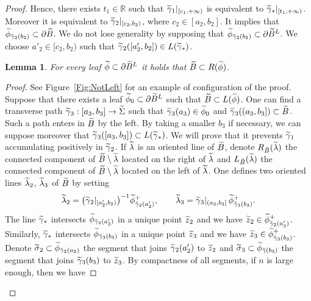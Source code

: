 \documentclass[10pt,a4paper]{article}
\newtheorem{lemm}[prop]{Lemma}
\theoremstyle{definition}
\theoremstyle{plain}
\numberwithin{equation}{section}
\numberwithin{figure}{section}
\newcommand{\R}{\mathbb{R}}
\let\oldtilde\tilde
\renewcommand*{\tilde}[1]{\mathchoice{\widetilde{#1}}{\widetilde{#1}}{\oldtilde{#1}}{\oldtilde{#1}}}
\begin{document}
\begin{proof}
Hence, there exists $t_1\in\R$ such that $\tilde\gamma_1|_{[c_1,+\infty)}$ is equivalent to $\tilde\gamma_*\vert_{[t_1,+\infty)}$. Moreover it is equivalent to $\tilde\gamma_2\vert_{[c_2,b_2)}$, where $c_2\in[a_2,b_2]$. It implies that $\tilde\phi_{\tilde\gamma_2(b_2)}\subset\partial\tilde B$. We do not lose generality by supposing that $\tilde\phi_{\tilde\gamma_2(b_2)}\subset\partial\tilde B^L$. We choose $a'_2\in[c_2,b_2)$ such that $\tilde\gamma_2([a'_2,b_2])\in L(\tilde\gamma_*)$.

\begin{lemm}\label{lem:NotLeft}
For every leaf $\tilde\phi\subset\partial\tilde B^L$ it holds that $\tilde B\subset R(\tilde \phi)$.
\end{lemm}

\begin{proof}
See Figure~\ref{Fig:NotLeft} for an example of configuration of the proof. Suppose that there exists a leaf $\tilde\phi_0\subset\partial\tilde B^L$ such that $\tilde B\subset L(\tilde \phi)$. One can find a transverse path $\tilde \gamma_3:[a_3,b_3]\to\tilde\Sigma$ such that $\tilde\gamma_3(a_3)\in\tilde\phi_0$ and $\tilde\gamma_3((a_3,b_3])\subset \tilde B$. Such a path enters in $\tilde B$ by the left. By taking a smaller $b_3$ if necessary, we can suppose moreover that $\tilde\gamma_3([a_3,b_3])\subset L(\tilde \gamma_*)$. We will prove that it prevents $\tilde\gamma_1$ accumulating positively in $\tilde\gamma_2$. If $\tilde \lambda$ is an oriented line of $\tilde B$, denote $R_{\tilde B}(\tilde\lambda)$ the connected component of $\tilde B\setminus\tilde\lambda$ located on the right of $\tilde\lambda$ and $L_{\tilde B}(\tilde\lambda)$ the connected component of $\tilde B\setminus\tilde\lambda$ located on the left of $\tilde\lambda$. One defines two oriented lines $\tilde\lambda_2$, $\tilde\lambda_3$ of $\tilde B$ by setting
\begin{equation}\label{Eq:NotLeft1}
\tilde\lambda_2=\big(\tilde\gamma_2\vert_{[a'_2,b_2)}\big)^{-1} \tilde\phi^+_{\tilde\gamma_2(a'_2)}, \qquad \tilde\lambda_3=\tilde\gamma_3\vert_{(a_3,b_3]}\, \tilde\phi^+_{\tilde \gamma_3(b_3)}.
\end{equation}
The line $\tilde\gamma_*$ intersects $\tilde\phi_{\tilde\gamma_2(a'_2)}$ in a unique point $\tilde z_2$ and we have $\tilde z_2\in\tilde\phi^+_{\tilde\gamma_2(a'_2)}$. Similarly, $\tilde\gamma_*$ intersects $\tilde\phi_{\tilde\gamma_3(b_3)}$ in a unique point $\tilde z_3$ and we have $\tilde z_3\in\tilde\phi^+_{\tilde\gamma_3(b_3)}$. Denote $\tilde\sigma_2\subset\tilde\phi_{\tilde\gamma_2(a_2)}$ the segment that joins $\tilde\gamma_2(a'_2)$ to $\tilde z_2$ and $\tilde\sigma_3\subset\tilde\phi_{\tilde\gamma(b_3)}$ the segment that joins $\tilde\gamma_3(b_3)$ to $\tilde z_3$. By compactness of all segments, if $n$ is large enough, then we have

\end{proof}
\end{proof}
\end{document}
